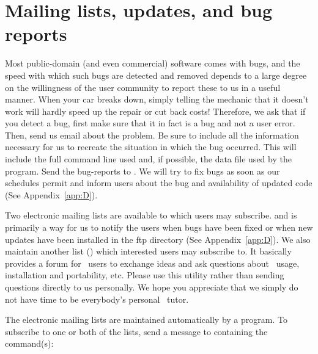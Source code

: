 %
%
\chapter{Mailing lists, updates, and bug reports}
\label{ch:8}
\thispagestyle{headings}

Most public-domain (and even commercial) software comes
with bugs, and the speed with which such bugs are detected
and removed depends to a large degree on the willingness
of the user community to report these to us in a useful
manner.  When your car breaks down, simply telling the
mechanic that it doesn't work will hardly speed up the
repair or cut back costs!  Therefore, we ask that if
you detect a bug, first make sure that it in fact is a
bug and not a user error.  Then, send us email about the
problem.  Be sure to include all the information necessary
for us to recreate the situation in which the bug occurred.
This will include the full command line used and, if
possible, the data file used by the program.  Send the
bug-reports to
.
We will try to fix bugs as soon as our schedules permit and
inform users about the bug and availability of updated code
(See Appendix~\ref{app:D}).

Two electronic mailing lists are available to which
users may subscribe. 
and is primarily a way for us to notify the users when bugs
have been fixed or when new updates have been installed in
the ftp directory (See Appendix~\ref{app:D}).  We also maintain another list
() which interested users may
subscribe to.  It basically provides a forum for \GMT\ users
to exchange ideas and ask questions about \GMT\ usage,
installation and portability, etc. Please use this utility
rather than sending questions directly to us personally.
We hope you appreciate that we simply do not have time to be
everybody's personal \GMT\ tutor.

The electronic mailing lists are maintained automatically
by a program.  To subscribe to one or both of the lists,
send a message to
containing the command(s):

